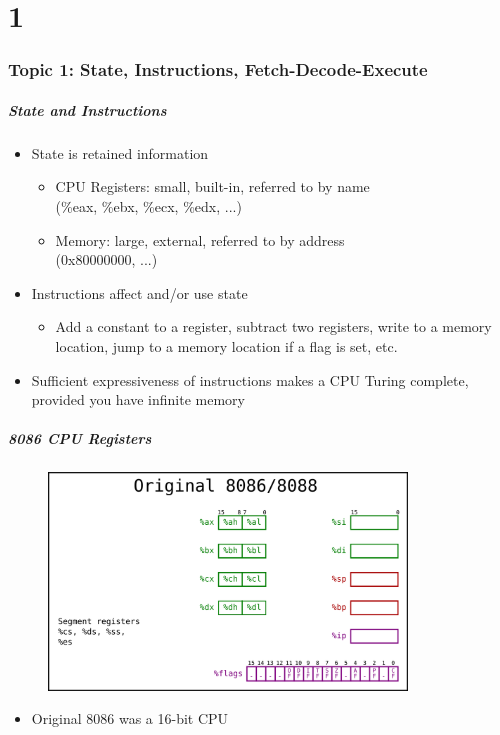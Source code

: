 \documentclass[11pt,xcolor=dvipsnames]{beamer}
\newcommand{\vs}{\vspace{0.5em}}
\newcommand{\mvs}{\vspace{-0.95em}}
\begin{document}
\part{1}

\section{Topic 1: State, Instructions, Fetch-Decode-Execute}
\begin{frame}[fragile,t]

\frametitle{State and Instructions}
\begin{itemize}
    \item State is retained information
    \begin{itemize}
        \item CPU Registers: small, built-in, referred to by name \\ ({\ttfamily \%eax, \%ebx, \%ecx, \%edx, ...})
        \item Memory: large, external, referred to by address \\ ({\ttfamily 0x80000000, ...})
    \end{itemize}
    \item Instructions affect and/or use state
    \begin{itemize}
        \item Add a constant to a register, subtract two registers, write to a memory location, jump to a memory location if a flag is set, etc.
    \end{itemize}
    \vs
    \pause
    \item Sufficient expressiveness of instructions makes a CPU Turing complete, provided you have infinite memory
\end{itemize}
\end{frame}

\begin{frame}[fragile,t]
\frametitle{8086 CPU Registers}
\mvs
\begin{figure}
\centering \includegraphics[width=0.85\textwidth]{figures/8086state.png}
\end{figure}
\begin{itemize}
    \item Original 8086 was a 16-bit CPU
\end{itemize}
\end{frame}
\end{document}
